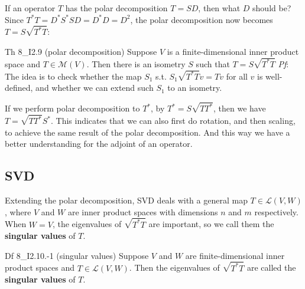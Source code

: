 \documentclass{article}
\begin{document}
If an operator $T$ has the polar decomposition $T = SD$, then what $D$ should be? Since $T^\ast T = D^\ast S^\ast S D = D^\ast D = D^2$, the polar decomposition now becomes $T = S\sqrt{T^\ast T}$:

\begin{Th}{Th 8\_I2.9 (polar decomposition)}
    Suppose $V$ is a finite-dimensional inner product space and $T\in\mathcal{M}(V)$. Then there is an isometry $S$ such that
    $T = S\sqrt{T^\ast T}$
    \tcblower
    \textit{Pf}: The idea is to check whether the map $S_1$ s.t. $S_1\sqrt{T^\ast T}v = Tv$ for all $v$ is well-defined, and whether we can extend such $S_1$ to an isometry.
\end{Th}

If we perform polar decomposition to $T^\ast$, by $T^\ast = S\sqrt{TT^\ast}$, then we have $T = \sqrt{TT^\ast} S^\ast$. This indicates that we can also first do rotation, and then scaling, to achieve the same result of the polar decomposition. And this way we have a better understanding for the adjoint of an operator.

\subsection{SVD}
Extending the polar decomposition, SVD deals with a general map $T\in\mathcal{L}(V,W)$, where $V$ and $W$ are inner product spaces with dimensions $n$ and $m$ respectively. When $W = V$, the eigenvalues of $\sqrt{T^\ast T}$ are important, so we call them the \textbf{singular values} of $T$.

\begin{Df}{Df 8\_I2.10.-1 (singular values)}
    Suppose $V$ and $W$ are finite-dimensional inner product spaces and $T\in\mathcal{L}(V,W)$. Then the eigenvalues of $\sqrt{T^\ast T}$ are called the \textbf{singular values} of $T$.
\end{Df}
\end{document}

